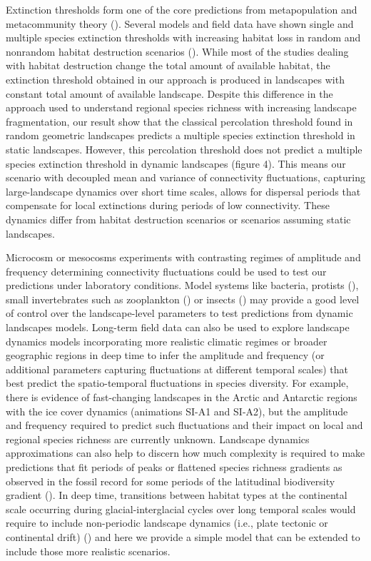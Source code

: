 \documentclass[12pt]{article}
\begin{document}
    Extinction thresholds form one of the core predictions from metapopulation and metacommunity theory (\cite{tilmanetal1994, bascompte&sole1996, keymeretal2000, fahrig2002, ovaskainenhanski2003, rybickihanski2013}). Several models and field data have shown single and multiple species extinction thresholds with increasing habitat loss in random and nonrandom habitat destruction scenarios (\cite{fortuna&bascompte2006}). While most of the studies dealing with habitat destruction change the total amount of available habitat, the extinction threshold obtained in our approach is produced in landscapes with constant total amount of available landscape. Despite this difference in the approach used to understand regional species richness with increasing landscape fragmentation, our result show that the classical percolation threshold found in random geometric landscapes predicts a multiple species extinction threshold in static landscapes. However, this percolation threshold does not predict a multiple species extinction threshold in dynamic landscapes (figure 4). This means our scenario with decoupled mean and variance of connectivity fluctuations, capturing large-landscape dynamics over short time scales, allows for dispersal periods that compensate for local extinctions during periods of low connectivity. These dynamics differ from habitat destruction scenarios or scenarios assuming static landscapes.
    
    Microcosm or mesocosms experiments with contrasting regimes of amplitude and frequency determining connectivity fluctuations could be used to test our predictions under laboratory conditions. Model systems like bacteria, protists (\cite{Carrara2012dendritic, AltermattEtAl2015}), small invertebrates such as zooplankton (\cite{Steiner2011seasonal_experiments}) or insects (\cite{GovindanSwihart2012}) may provide a good level of control over the landscape-level parameters to test predictions from dynamic landscapes models. Long-term field data can also be used to explore landscape dynamics models incorporating more realistic climatic regimes or broader geographic regions in deep time to infer the amplitude and frequency (or additional parameters capturing fluctuations at different temporal scales) that best predict the spatio-temporal fluctuations in species diversity. For example, there is evidence of fast-changing landscapes in the Arctic and Antarctic regions with the ice cover dynamics (animations SI-A1 and SI-A2), but the amplitude and frequency required to predict such fluctuations and their impact on local and regional species richness are currently unknown. Landscape dynamics approximations can also help to discern how much complexity is required to make predictions that fit periods of peaks or flattened species richness gradients as observed in the fossil record for some periods of the latitudinal biodiversity gradient (\cite{mannionetal2014}). In deep time, transitions between habitat types at the continental scale occurring during glacial-interglacial cycles over long temporal scales would require to include non-periodic landscape dynamics (i.e., plate tectonic or continental drift) (\cite{WerneckEtAl2011}) and here we provide a simple model that can be extended to include those more realistic scenarios.
     
\end{document}
